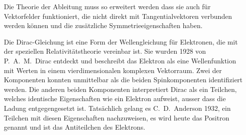 \begin{aufgabe}
Die Theorie der Ableitung muss so erweitert werden dass sie auch für
Vektorfelder funktioniert, die nicht direkt mit Tangentialvektoren
verbunden werden können und die zusätzliche Symmetrieeigenschaften
haben.
\end{aufgabe}

Die Dirac-Gleichung ist eine Form der Wellengleichung für Elektronen,
die mit der speziellen Relativitätstheorie vereinbar ist.
Sie wurden 1928 von P.~A.~M.~Dirac entdeckt und beschreibt das Elektron
als eine Wellenfunktion mit Werten in einem vierdimensionalen komplexen
Vektorraum.
Zwei der Komponenten konnten unmittelbar als die beiden Spinkomponenten
identifiziert werden.
Die anderen beiden Komponenten interpretiert Dirac als ein Teilchen,
welches identische Eigenschaften wie ein Elektron aufweist, ausser dass
die Ladung entgegengesetzt ist.
Tatsächlich gelang es C.~D.~Anderson 1932, ein Teilchen mit diesen
Eigenschaften nachzuweisen, es wird heute das Positron genannt und ist
das Antiteilchen des Elektrons.





